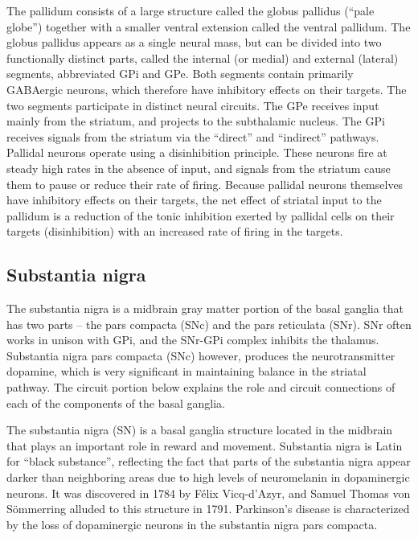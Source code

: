 The pallidum consists of a large structure called the globus pallidus (``pale globe'') together with a smaller ventral extension called the ventral pallidum. The globus pallidus appears as a single neural mass, but can be divided into two functionally distinct parts, called the internal (or medial) and external (lateral) segments, abbreviated GPi and GPe. Both segments contain primarily GABAergic neurons, which therefore have inhibitory effects on their targets. The two segments participate in distinct neural circuits. The GPe receives input mainly from the striatum, and projects to the subthalamic nucleus. The GPi receives signals from the striatum via the ``direct'' and ``indirect'' pathways. Pallidal neurons operate using a disinhibition principle. These neurons fire at steady high rates in the absence of input, and signals from the striatum cause them to pause or reduce their rate of firing. Because pallidal neurons themselves have inhibitory effects on their targets, the net effect of striatal input to the pallidum is a reduction of the tonic inhibition exerted by pallidal cells on their targets (disinhibition) with an increased rate of firing in the targets.

\hypertarget{substantia-nigra}{%
\subsection{Substantia nigra}\label{substantia-nigra}}

The substantia nigra is a midbrain gray matter portion of the basal ganglia that has two parts -- the pars compacta (SNc) and the pars reticulata (SNr). SNr often works in unison with GPi, and the SNr-GPi complex inhibits the thalamus. Substantia nigra pars compacta (SNc) however, produces the neurotransmitter dopamine, which is very significant in maintaining balance in the striatal pathway. The circuit portion below explains the role and circuit connections of each of the components of the basal ganglia.

The substantia nigra (SN) is a basal ganglia structure located in the midbrain that plays an important role in reward and movement. Substantia nigra is Latin for ``black substance'', reflecting the fact that parts of the substantia nigra appear darker than neighboring areas due to high levels of neuromelanin in dopaminergic neurons. It was discovered in 1784 by Félix Vicq-d'Azyr, and Samuel Thomas von Sömmerring alluded to this structure in 1791. Parkinson's disease is characterized by the loss of dopaminergic neurons in the substantia nigra pars compacta.

